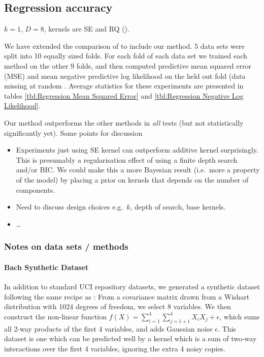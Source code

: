 \documentclass[twoside]{article}
\begin{document}
\subsection{Regression accuracy}

$k = 1$, $D = 8$, kernels are SE and RQ ().

We have extended the comparison of \cite{duvenaud2011additive11} to include our method.
5 data sets were split into 10 equally sized folds.
For each fold of each data set we trained each method on the other 9 folds, and then computed predictive mean squared error (MSE) and mean negative predictive log likelihood on the held out fold (data missing at random .
Average statistics for these experiments are presented in tables \ref{tbl:Regression Mean Squared Error} and \ref{tbl:Regression Negative Log Likelihood}.




Our method outperforms the other methods in \emph{all} tests (but not statistically significantly yet).
Some points for discussion
\begin{itemize}
\item Experiments just using SE kernel can outperform additive kernel surprisingly. This is presumably a regularisation effect of using a finite depth search and/or BIC. We could make this a more Bayesian result (i.e.~more a property of the model) by placing a prior on kernels that depends on the number of components.
\item Need to discuss design choices e.g.~$k$, depth of search, base kernels.
\item \ldots
\end{itemize}

\subsubsection{Notes on data sets / methods}

\paragraph{Bach Synthetic Dataset}
In addition to standard UCI repository datasets, we generated a synthetic dataset following the same recipe as \cite{DBLP:journals/corr/abs-0909-0844}: From a covariance matrix drawn from a Wishart distribution with 1024 degrees of freedom, we select 8 variables.  We then construct the non-linear function $f(X) = \sum_{i=1}^4 \sum_{j=1+1}^4 X_i X_j + \epsilon$, which sums all 2-way products of the first 4 variables, and adds Gaussian noise $\epsilon$.  This dataset is one which can be predicted well by a kernel which is a sum of two-way interactions over the first 4 variables, ignoring the extra 4 noisy copies.
\end{document}
